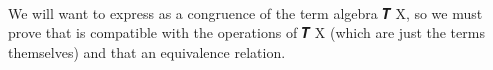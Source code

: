 \documentclass[a4paper,UKenglish,cleveref,autoref,thm-restate]{lipics-v2021}
\begin{document}
\begin{code}%
\>[1]\AgdaSpace{}%
\AgdaSymbol{:}\AgdaSpace{}%
\AgdaSymbol{(}\AgdaSpace{}%
\AgdaSymbol{:}\AgdaSpace{}%
\AgdaSpace{}%
\AgdaSymbol{(}\AgdaSpace{}%
\AgdaSpace{}%
\AgdaSymbol{)}\AgdaSpace{}%
\AgdaSymbol{(}\AgdaSpace{}%
\AgdaSymbol{))}\AgdaSpace{}%
\AgdaSpace{}%
\AgdaSpace{}%
\AgdaSpace{}%
\AgdaSymbol{(}\AgdaSpace{}%
\AgdaSymbol{)}\AgdaSpace{}%
\AgdaSpace{}%
\AgdaSymbol{(}\AgdaSpace{}%
\AgdaSymbol{)}\<%
\\
%
\>[1]\AgdaSpace{}%
\AgdaSpace{}%
\AgdaSpace{}%
\AgdaSpace{}%
\AgdaSymbol{=}\AgdaSpace{}%
\AgdaSpace{}%
\AgdaSpace{}%
\AgdaSymbol{(}\AgdaSpace{}%
\AgdaOperator{\AgdaInductiveConstructor{,}}\AgdaSpace{}%
\AgdaSymbol{)}\<%
\end{code}
\ccpad
We will want to express  as a congruence of the term algebra \af 𝑻 \ab X, so we must prove that  is compatible with the operations of \af 𝑻 \ab X (which are just the terms themselves) and that  an equivalence relation.
\ccpad
\end{document}
